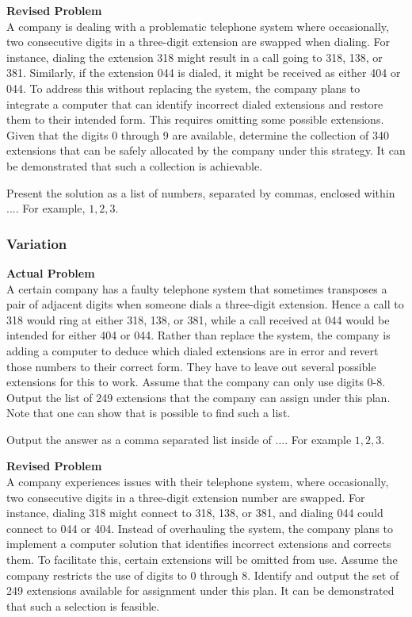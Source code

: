 \textbf{Revised Problem}\\
A company is dealing with a problematic telephone system where occasionally, two consecutive digits in a three-digit extension are swapped when dialing. For instance, dialing the extension 318 might result in a call going to 318, 138, or 381. Similarly, if the extension 044 is dialed, it might be received as either 404 or 044. To address this without replacing the system, the company plans to integrate a computer that can identify incorrect dialed extensions and restore them to their intended form. This requires omitting some possible extensions. Given that the digits 0 through 9 are available, determine the collection of 340 extensions that can be safely allocated by the company under this strategy. It can be demonstrated that such a collection is achievable.

Present the solution as a list of numbers, separated by commas, enclosed within $\boxed{...}$. For example, $\boxed{1, 2, 3}$.

\subsubsection{Variation}
\textbf{Actual Problem}\\
A certain company has a faulty telephone system that sometimes transposes a pair of
adjacent digits when someone dials a three-digit extension. Hence a call to 318 would ring
at either 318, 138, or 381, while a call received at 044 would be intended for either
404 or 044. Rather than replace the system, the company is adding a computer to deduce
which dialed extensions are in error and revert those numbers to their correct form. They have
to leave out several possible extensions for this to work.
Assume that the company can only use digits 0-8. Output the list of 249 extensions that the company can assign under this plan.
Note that one can show that is possible to find such a list.


Output the answer as a comma separated list inside of $\boxed{...}$. For example $\boxed{1, 2, 3}$.

\textbf{Revised Problem}\\
A company experiences issues with their telephone system, where occasionally, two consecutive digits in a three-digit extension number are swapped. For instance, dialing 318 might connect to 318, 138, or 381, and dialing 044 could connect to 044 or 404. Instead of overhauling the system, the company plans to implement a computer solution that identifies incorrect extensions and corrects them. To facilitate this, certain extensions will be omitted from use.
Assume the company restricts the use of digits to 0 through 8. Identify and output the set of 249 extensions available for assignment under this plan.
It can be demonstrated that such a selection is feasible.

